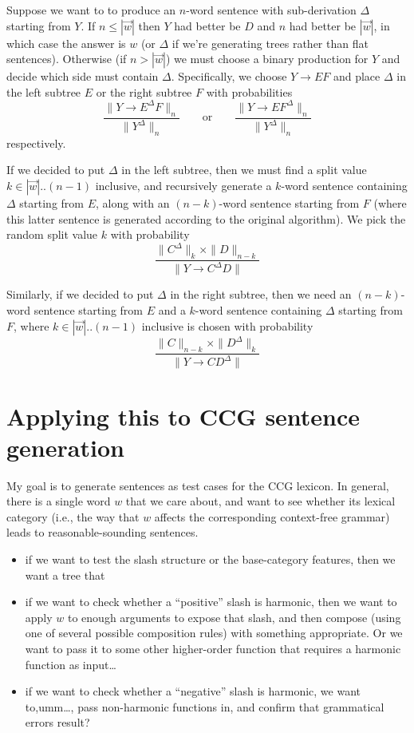 \documentclass[12pt]{article}
\begin{document}
Suppose we want to to produce an $n$-word sentence with sub-derivation $\Delta$ starting from $Y$. If $n \leq |\vec{w}|$ then $Y$ had better be $D$ and $n$ had better be $|\vec{w}|$, in which case the answer is $w$ (or $\Delta$ if we're generating trees rather than flat sentences). Otherwise (if $n > |\vec{w}|$) we must choose a binary production for $Y$ and decide which side must contain $\Delta$. Specifically, we choose $Y \to EF$ and place $\Delta$ in the left subtree $E$ or the right subtree $F$ with probabilities
\[ \frac{\|Y\to E^\Delta F\|_n}{\|Y^\Delta\|_n}
\qquad\mbox{or}\qquad
\frac{\|Y\to EF^\Delta\|_n}{\|Y^\Delta\|_n}
\]
respectively.
\goodbreak{}

If we decided to put $\Delta$ in the left subtree, then we must find a split value $k\in |\vec{w}|..(n{-}1)$ inclusive, and recursively generate a $k$-word sentence containing $\Delta$ starting from $E$, along with an $(n{-}k)$-word sentence starting from $F$ (where this latter sentence is generated according to the
original algorithm). We pick the random split value $k$ with probability
\[
    \frac{\|C^\Delta\|_k\times \|D\|_{n{-}k}}{\|Y \to C^\Delta D\|}
\]


Similarly, if we decided to put $\Delta$ in the right subtree, then we need an $(n{-}k)$-word sentence starting from $E$ and a $k$-word sentence containing $\Delta$ starting from $F$, where $k \in |\vec{w}|..(n{-}1)$ inclusive is chosen with probability
\[
    \frac{\|C\|_{n{-}k}\times \|D^\Delta\|_k}{\|Y \to CD^\Delta\|}
\]

\section{Applying this to CCG sentence generation}

My goal is to generate sentences as test cases for the CCG lexicon. In general, there is a single word $w$ that we care about, and want to see whether its lexical category (i.e., the way that $w$ affects the corresponding context-free grammar) leads to reasonable-sounding sentences.

\begin{itemize}
\item if we want to test the slash structure or the base-category features, then we want a tree that
\item if we want to check whether a ``positive'' slash is harmonic, then we want to apply $w$ to enough arguments to expose that slash, and then compose (using one of several possible composition rules) with something appropriate.  Or we want to pass it to some other higher-order function that requires a harmonic function as input\ldots
\item if we want to check whether a ``negative'' slash is harmonic, we want to,umm\ldots, pass non-harmonic functions in, and confirm that grammatical errors result?
\end{itemize}
\end{document}
